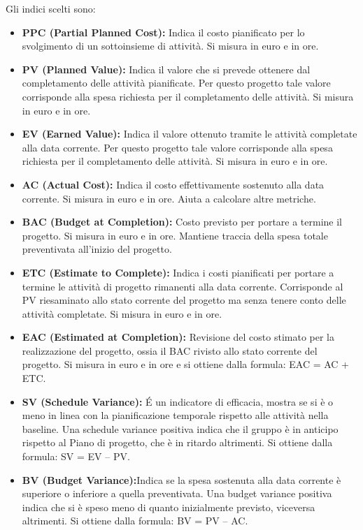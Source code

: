 \documentclass[a4paper]{article}
\begin{document}
				Gli indici scelti sono:
				\begin{itemize}
					\item \textbf{PPC (Partial Planned Cost):} Indica il costo pianificato per lo svolgimento di un sottoinsieme
					di attività. Si misura in euro e in ore.
					\item \textbf{PV (Planned Value):} Indica il valore che si prevede ottenere dal completamento delle attività
					pianificate. Per questo progetto tale valore corrisponde alla spesa richiesta per il completamento delle attività.
					Si misura in euro e in ore.
					\item \textbf{EV (Earned Value):} Indica il valore ottenuto tramite le attività completate alla data 
					corrente. Per questo progetto tale valore corrisponde alla spesa richiesta per il completamento delle attività.
					Si misura in euro e in ore.
					\item \textbf{AC (Actual Cost):} Indica il costo effettivamente sostenuto alla data corrente.
					Si misura in euro e in ore. Aiuta a calcolare altre metriche.
					\item \textbf{BAC (Budget at Completion):} Costo previsto per portare a termine il progetto.
					Si misura in euro e in ore. Mantiene traccia della spesa totale preventivata all'inizio del progetto.
					\item \textbf{ETC (Estimate to Complete):} Indica i costi pianificati per portare a termine le attività di
					progetto rimanenti alla data corrente. Corrisponde al PV riesaminato allo stato corrente del progetto ma
					senza tenere conto delle attività completate. 
					Si misura in euro e in ore.
					\item \textbf{EAC (Estimated at Completion):} Revisione del costo stimato per la realizzazione del progetto, 
					ossia il BAC rivisto allo stato corrente del progetto. Si misura in euro e in ore e si ottiene dalla formula:
					  EAC = AC + ETC. 
					\item \textbf{SV (Schedule Variance):} É un indicatore di efficacia, mostra se si è o meno in linea con la
					pianificazione temporale rispetto alle attività nella baseline. Una schedule variance positiva indica che il
					gruppo è in anticipo rispetto al Piano di progetto, che è in ritardo altrimenti.
					Si ottiene dalla formula: SV = EV – PV.
					\item \textbf{BV (Budget Variance):}Indica se la spesa sostenuta alla data corrente è superiore o inferiore a
					quella preventivata. Una budget variance positiva indica che si è speso meno di quanto inizialmente previsto,
					viceversa altrimenti. Si ottiene dalla formula: BV = PV – AC.
			\end{itemize} 
				
\end{document}
